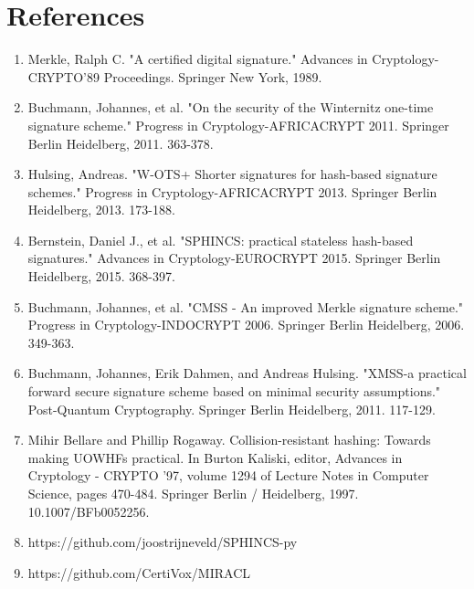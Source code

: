 \documentclass[]{scrartcl}
\begin{document}
\section*{References}
\begin{enumerate}
	\item Merkle, Ralph C. "A certified digital signature." Advances in Cryptology-CRYPTO'89 Proceedings. Springer New York, 1989.
	\item Buchmann, Johannes, et al. "On the security of the Winternitz one-time signature scheme." Progress in Cryptology-AFRICACRYPT 2011. Springer Berlin Heidelberg, 2011. 363-378.
	\item Hulsing, Andreas. "W-OTS+ Shorter signatures for hash-based signature schemes." Progress in Cryptology-AFRICACRYPT 2013. Springer Berlin Heidelberg, 2013. 173-188.
	\item Bernstein, Daniel J., et al. "SPHINCS: practical stateless hash-based signatures." Advances in Cryptology-EUROCRYPT 2015. Springer Berlin Heidelberg, 2015. 368-397.
	\item Buchmann, Johannes, et al. "CMSS - An improved Merkle signature scheme." Progress in Cryptology-INDOCRYPT 2006. Springer Berlin Heidelberg, 2006. 349-363.
	\item Buchmann, Johannes, Erik Dahmen, and Andreas Hulsing. "XMSS-a practical forward secure signature scheme based on minimal security assumptions." Post-Quantum Cryptography. Springer Berlin Heidelberg, 2011. 117-129.
	\item Mihir Bellare and Phillip Rogaway. Collision-resistant hashing: Towards making UOWHFs practical. In Burton Kaliski, editor, Advances in Cryptology - CRYPTO '97, volume 1294 of Lecture Notes in Computer Science, pages 470-484. Springer Berlin / Heidelberg, 1997. 10.1007/BFb0052256.
	\item https://github.com/joostrijneveld/SPHINCS-py
	\item https://github.com/CertiVox/MIRACL
\end{enumerate}
\end{document}

